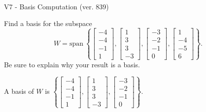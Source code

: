 \begin{exercise}
  \begin{exerciseTitle}V7 - Basis Computation (ver. 839)\end{exerciseTitle}
  \begin{exerciseStatement}
    Find a basis for the subspace 
\[W=\mathrm{span}\ \left\{\left[\begin{array}{r}
-4 \\
-4 \\
-1 \\
1
\end{array}\right] , \left[\begin{array}{r}
1 \\
3 \\
3 \\
-3
\end{array}\right] , \left[\begin{array}{r}
-3 \\
-2 \\
-1 \\
0
\end{array}\right] , \left[\begin{array}{r}
1 \\
-4 \\
-5 \\
6
\end{array}\right]\right\}.\]
 Be sure to explain why your result is a basis.


  \end{exerciseStatement}
  \begin{exerciseAnswer}
   A basis of \(W\) is  \(\left\{\left[\begin{array}{r}
-4 \\
-4 \\
-1 \\
1
\end{array}\right] , \left[\begin{array}{r}
1 \\
3 \\
3 \\
-3
\end{array}\right] , \left[\begin{array}{r}
-3 \\
-2 \\
-1 \\
0
\end{array}\right]\right\}\).
  


  \end{exerciseAnswer}
\end{exercise}